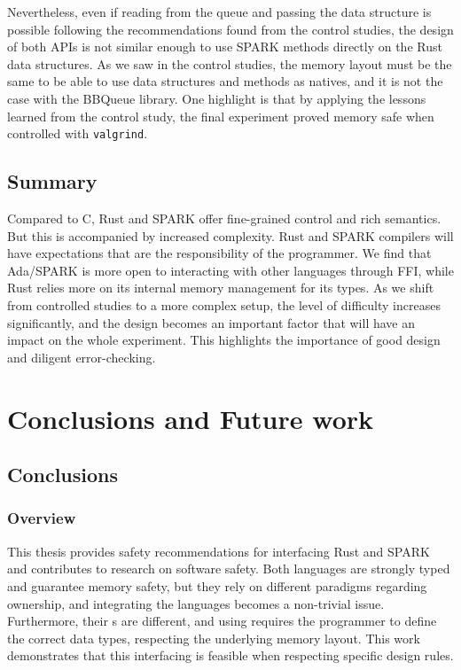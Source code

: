\documentclass[nomenclature, english, bibtex]{kththesis}
\begin{document}
{\begin{figure}
    \label{fig:memBBqueue}
\end{figure}


Nevertheless, even if reading from the queue and passing the data structure is possible following the recommendations found from the control studies, the design of both APIs is not similar enough to use SPARK methods directly on the Rust data structures. As we saw in the control studies, the memory layout must be the same to be able to use data structures and methods as natives, and it is not the case with the BBQueue library.
One highlight is that by applying the lessons learned from the control study, the final experiment proved memory safe when controlled with \texttt{valgrind}.

\section{Summary}

Compared to C, Rust and SPARK offer fine-grained control and rich semantics. But this is accompanied by increased complexity. Rust and SPARK compilers will have expectations that are the responsibility of the programmer. We find that Ada/SPARK is more open to interacting with other languages through \gls{FFI}, while Rust relies more on its internal memory management for its types.
As we shift from controlled studies to a more complex setup, the level of difficulty increases significantly, and the design becomes an important factor that will have an impact on the whole experiment. This highlights the importance of good design and diligent error-checking.


\cleardoublepage

\chapter{Conclusions and Future work}
\label{ch:conclusionsAndFutureWork}

\section{Conclusions}
\label{sec:conclusions}

\subsection{Overview}

This thesis provides safety recommendations for interfacing Rust and SPARK and contributes to research on software safety. Both languages are strongly typed and guarantee memory safety, but they rely on different paradigms regarding ownership, and integrating the languages becomes a non-trivial issue. Furthermore, their s are different, and using  requires the programmer to define the correct data types, respecting the underlying memory layout. This work demonstrates that this interfacing is feasible when respecting specific design rules.

}
\end{document}

